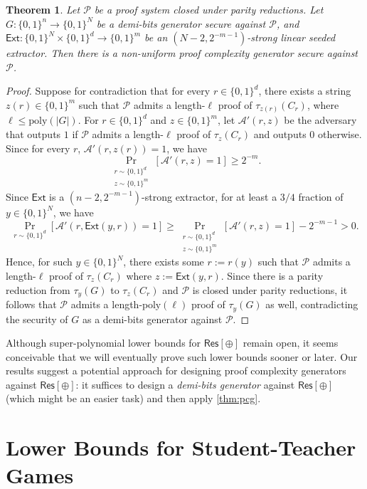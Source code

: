 \documentclass[10pt,a4paper]{article}
\newtheorem{theorem}{Theorem}[section]
\theoremstyle{definition}
\theoremstyle{remark}
\renewcommand{\poly}{\mathrm{poly}}
\newcommand{\Ext}{\mathsf{Ext}}
\newcommand{\Res}{\mathsf{Res}}
\newcommand{\calA}{\mathcal{A}}
\newcommand{\calP}{\mathcal{P}}
\begin{document}
\begin{theorem}\label{thm:pcg}
    Let $\calP$ be a proof system closed under parity reductions. Let $G: \{0, 1\}^n \to \{0, 1\}^N$ be a demi-bits generator secure against $\calP$, and $\Ext: \{0, 1\}^N \times \{0, 1\}^d \to \{0, 1\}^m$ be an $(N-2, 2^{-m-1})$-strong linear seeded extractor. Then there is a non-uniform proof complexity generator secure against $\calP$.
\end{theorem}
\begin{proof}
    Suppose for contradiction that for every $r\in \{0, 1\}^d$, there exists a string $z(r) \in \{0, 1\}^m$ such that $\calP$ admits a length-$\ell$ proof of $\tau_{z(r)}(C_r)$, where $\ell \le \poly(|G|)$. For $r \in \{0, 1\}^d$ and $z\in \{0, 1\}^m$, let $\calA'(r, z)$ be the adversary that outputs $1$ if $\calP$ admits a length-$\ell$ proof of $\tau_z(C_r)$ and outputs $0$ otherwise. Since for every $r$, $\calA'(r, z(r)) = 1$, we have
    \[\Pr_{\substack{r\sim \{0, 1\}^d\\z\sim \{0, 1\}^m}}[\calA'(r, z) = 1] \ge 2^{-m}.\]
    Since $\Ext$ is a $(n-2, 2^{-m-1})$-strong extractor, for at least a $3/4$ fraction of $y \in \{0, 1\}^N$, we have
    \[\Pr_{r\sim \{0, 1\}^d}[\calA'(r, \Ext(y, r)) = 1] \ge \Pr_{\substack{r\sim \{0, 1\}^d\\z\sim \{0, 1\}^m}}[\calA'(r, z) = 1] - 2^{-m-1} > 0.\]
    Hence, for such $y \in \{0, 1\}^N$, there exists some $r := r(y)$ such that $\calP$ admits a length-$\ell$ proof of $\tau_z(C_r)$ where $z := \Ext(y, r)$. Since there is a parity reduction from $\tau_y(G)$ to $\tau_z(C_r)$ and $\calP$ is closed under parity reductions, it follows that $\calP$ admits a length-$\poly(\ell)$ proof of $\tau_y(G)$ as well, contradicting the security of $G$ as a demi-bits generator against $\calP$.
\end{proof}

Although super-polynomial lower bounds for $\Res[\oplus]$ remain open, it seems conceivable that we will eventually prove such lower bounds sooner or later. Our results suggest a potential approach for designing proof complexity generators against $\Res[\oplus]$: it suffices to design a \emph{demi-bits generator} against $\Res[\oplus]$ (which might be an easier task) and then apply \autoref{thm:pcg}.






\section{Lower Bounds for Student-Teacher Games}\label{sec:proof-complexity-app}
\end{document}
